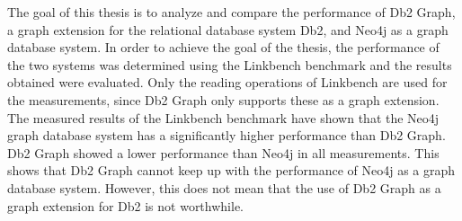 The goal of this thesis is to analyze and compare the performance of Db2 Graph, a graph extension for the relational database system Db2, and Neo4j as a graph database system. In order to achieve the goal of the thesis, the performance of the two systems was determined using the Linkbench benchmark and the results obtained were evaluated. Only the reading operations of Linkbench are used for the measurements, since Db2 Graph only supports these as a graph extension. The measured results of the Linkbench benchmark have shown that the Neo4j graph database system has a significantly higher performance than Db2 Graph. Db2 Graph showed a lower performance than Neo4j in all measurements. This shows that Db2 Graph cannot keep up with the performance of Neo4j as a graph database system. However, this does not mean that the use of Db2 Graph as a graph extension for Db2 is not worthwhile. 